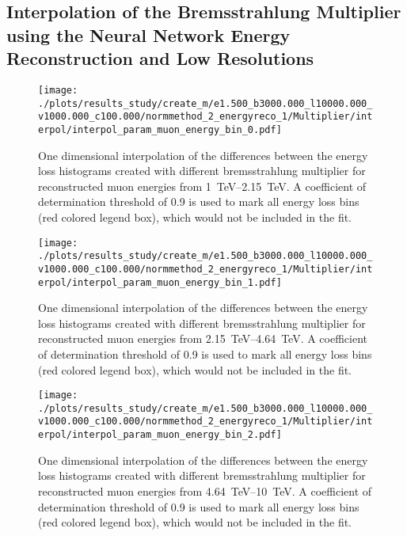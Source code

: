 %

\subsection{Interpolation of the Bremsstrahlung Multiplier using the Neural Network Energy Reconstruction and Low Resolutions}

\begin{figure}[H]
    \centering
    \texttt{[image: ./plots/results\_study/create\_m/e1.500\_b3000.000\_l10000.000\_v1000.000\_c100.000/normmethod\_2\_energyreco\_1/Multiplier/interpol/interpol\_param\_muon\_energy\_bin\_0.pdf]}
    \caption{One dimensional interpolation of the differences between the energy loss histograms created with different bremsstrahlung multiplier for reconstructed muon energies from \SIrange{1}{2.15}{TeV}. A coefficient of determination threshold of \num{0.9} is used to mark all energy loss bins (red colored legend box), which would not be included in the fit.}
    \label{fig:study_1d_interpol_mu0_nn_low}
\end{figure}

\begin{figure}[H]
    \centering
    \texttt{[image: ./plots/results\_study/create\_m/e1.500\_b3000.000\_l10000.000\_v1000.000\_c100.000/normmethod\_2\_energyreco\_1/Multiplier/interpol/interpol\_param\_muon\_energy\_bin\_1.pdf]}
    \caption{One dimensional interpolation of the differences between the energy loss histograms created with different bremsstrahlung multiplier for reconstructed muon energies from \SIrange{2.15}{4.64}{TeV}. A coefficient of determination threshold of \num{0.9} is used to mark all energy loss bins (red colored legend box), which would not be included in the fit.}
    \label{fig:study_1d_interpol_mu1_nn_low}
\end{figure}

\begin{figure}[H]
    \centering
    \texttt{[image: ./plots/results\_study/create\_m/e1.500\_b3000.000\_l10000.000\_v1000.000\_c100.000/normmethod\_2\_energyreco\_1/Multiplier/interpol/interpol\_param\_muon\_energy\_bin\_2.pdf]}
    \caption{One dimensional interpolation of the differences between the energy loss histograms created with different bremsstrahlung multiplier for reconstructed muon energies from \SIrange{4.64}{10}{TeV}. A coefficient of determination threshold of \num{0.9} is used to mark all energy loss bins (red colored legend box), which would not be included in the fit.}
    \label{fig:study_1d_interpol_mu2_nn_low}
\end{figure}

